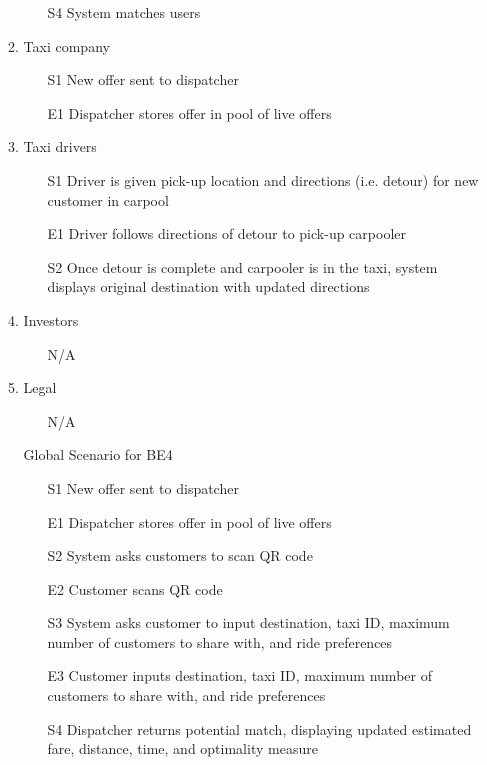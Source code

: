 \documentclass[]{article}
\begin{document}
\begin{enumerate}[{BE}1.]
\begin{enumerate}[{VP4}.1]
\begin{enumerate}
\begin{enumerate}
				\end{enumerate}
				\item[S4] System matches users
			\end{enumerate}
		\item Taxi company
			\begin{enumerate}
				\item[S1] New offer sent to dispatcher
				\item[E1] Dispatcher stores offer in pool of live offers
			\end{enumerate}
		\item Taxi drivers
			\begin{enumerate}
				\item[S1] Driver is given pick-up location and directions (i.e. detour) for new customer in carpool
				\item[E1] Driver follows directions of detour to pick-up carpooler
				\item[S2] Once detour is complete and carpooler is in the taxi, system displays original destination with updated directions
			\end{enumerate}
		\item Investors
			\begin{enumerate}
				\item[N/A]
			\end{enumerate}
		\item Legal
			\begin{enumerate}
				\item[N/A]
			\end{enumerate}
		\item[Global] Scenario for BE4
			\begin{enumerate}
				\item[S1] New offer sent to dispatcher
				\item[E1] Dispatcher stores offer in pool of live offers
				\item[S2] System asks customers to scan QR code
				\item[E2] Customer scans QR code
				\item[S3] System asks customer to input destination, taxi ID, maximum number of customers to share with, and ride preferences
				\item[E3] Customer inputs destination, taxi ID, maximum number of customers to share with, and ride preferences
				\item[S4] Dispatcher returns potential match, displaying updated estimated fare, distance, time, and optimality measure

\end{enumerate}
\end{enumerate}
\end{enumerate}
\end{document}
